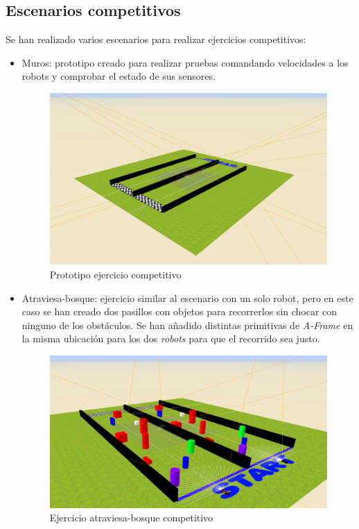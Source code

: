 \subsection{Escenarios competitivos}

Se han realizado varios escenarios para realizar ejercicios competitivos:
\begin{itemize}
    \item Muros: prototipo creado para realizar pruebas comandando velocidades a los robots y comprobar el estado de sus sensores.
      
       \begin{figure}[H]
        \centering           
        \includegraphics[scale=0.3]{img/ejercicio_muros.png}
        \caption{Prototipo ejercicio competitivo}
        \label{fig:ejercicio_muro}
    \end{figure}

    
    \item Atraviesa-bosque: ejercicio similar al escenario con un solo robot, pero en este caso se han creado dos pasillos con objetos para recorrerlos sin chocar con ninguno de los obstáculos. Se han añadido distintas primitivas de \textit{A-Frame} en la misma ubicación para los dos \textit{robots} para que el recorrido sea justo.
    
    \begin{figure}[H]
        \centering           
        \includegraphics[scale=0.3]{img/ejercicio_atraviesabosque.png}
        \caption{Ejercicio atraviesa-bosque competitivo}
        \label{fig:atraviesabosque_escenario}
    \end{figure}
    

\end{itemize}
